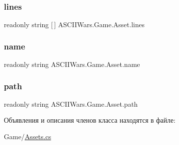 \subsubsection{\texorpdfstring{lines}{lines}}
{\footnotesize\ttfamily readonly string \mbox{[}$\,$\mbox{]} A\+S\+C\+I\+I\+Wars.\+Game.\+Asset.\+lines}

\hypertarget{class_a_s_c_i_i_wars_1_1_game_1_1_asset_a5bd9f716708c7943bdd313357da7d7f3}{}\label{class_a_s_c_i_i_wars_1_1_game_1_1_asset_a5bd9f716708c7943bdd313357da7d7f3} 
\subsubsection{\texorpdfstring{name}{name}}
{\footnotesize\ttfamily readonly string A\+S\+C\+I\+I\+Wars.\+Game.\+Asset.\+name}

\hypertarget{class_a_s_c_i_i_wars_1_1_game_1_1_asset_a2d1d00016592f2930725bf14a2a05fb8}{}\label{class_a_s_c_i_i_wars_1_1_game_1_1_asset_a2d1d00016592f2930725bf14a2a05fb8} 
\subsubsection{\texorpdfstring{path}{path}}
{\footnotesize\ttfamily readonly string A\+S\+C\+I\+I\+Wars.\+Game.\+Asset.\+path}



Объявления и описания членов класса находятся в файле\+:\begin{DoxyCompactItemize}
\item 
Game/\hyperlink{_assets_8cs}{Assets.\+cs}\end{DoxyCompactItemize}
